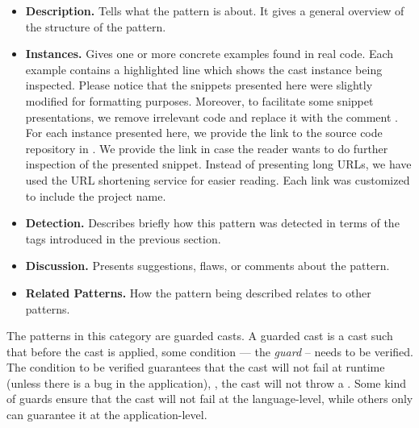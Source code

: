 \begin{itemize}
\item \textbf{Description.}
Tells what the pattern is about.
It gives a general overview of the structure of the pattern.
\item \textbf{Instances.}
Gives one or more concrete examples found in real code.
%
%
Each example contains a highlighted line which shows the cast instance being inspected.
Please notice that the snippets presented here were slightly
modified for formatting purposes.
Moreover, to facilitate some snippet presentations,
we remove irrelevant code and replace it with the
comment \code{// [...]}.
For each instance presented here, we provide the link to the source code repository in \lgtm{}.
We provide the link in case the reader wants to do further inspection
of the presented snippet.
%
%
Instead of presenting \lgtm{} long URLs,
we have used the URL shortening service
\href{https://bitly.com/}{\bitly} for easier reading.
%
%
Each link was customized to include the project name.
\item \textbf{Detection.}
Describes briefly how this pattern was detected in terms of the tags introduced in the previous section.
\item \textbf{Discussion.}
Presents suggestions, flaws, or comments about the pattern.
\item \textbf{Related Patterns.}
%
%
How the pattern being described relates to other patterns.
\end{itemize}


The patterns in this category are guarded casts.
A guarded cast is a cast such that before the cast is applied,
some condition --- the \emph{guard} -- needs to be verified.
The condition to be verified guarantees that the cast will not fail at runtime (unless there is a bug in the application), \ie,
the cast will not throw a .
Some kind of guards ensure that the cast will not fail at the language-level,
while others only can guarantee it at the application-level.






